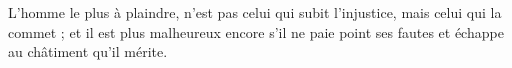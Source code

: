 L'homme le plus à plaindre, n'est pas celui qui subit l'injustice, mais celui qui la commet ; et il est plus malheureux encore s'il ne paie point ses fautes et échappe au châtiment qu'il mérite.%


\begin{comment}
POLOS : C'est sans doute celui qui meurt injustement qui est digne de pitié et malheureux ?\\
SOCRATE : Moins que celui qui le tue, Polos, et moins que celui qui meurt justement.
\end{comment}
